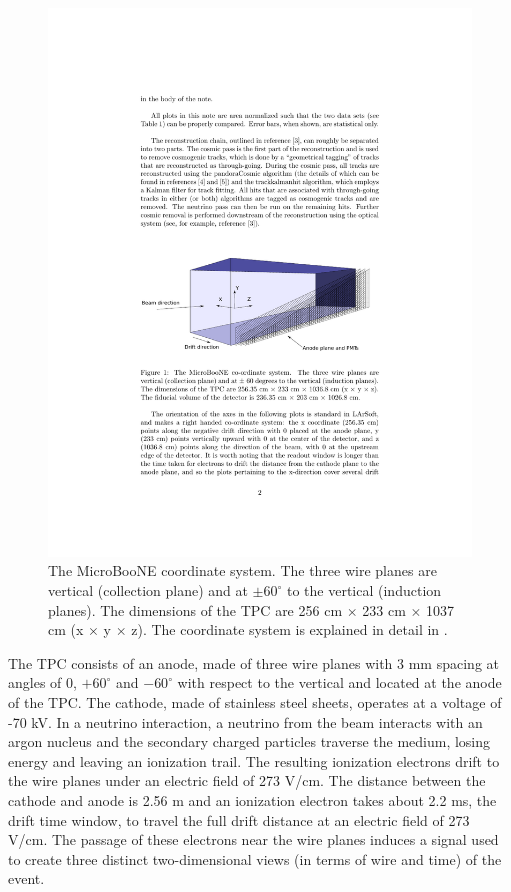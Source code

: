 \documentclass[a4paper,11pt]{article}
\begin{document}
\begin{figure}[htbp]
  \begin{center}
    \includegraphics[width=0.8\linewidth]{figures/coord.pdf}

    \caption{The MicroBooNE coordinate system. The three wire planes are vertical (collection plane) and at  $\pm60^{\circ}$ to the vertical (induction planes). The dimensions of the TPC are 256 cm $\times$ 233 cm $\times$ 1037 cm (x $\times$ y $\times$ z). The coordinate system is explained in detail in \cite{mcdata}.} \label{fig:coord}
  \end{center}
\end{figure}

The TPC consists of an anode, made of three wire planes with 3 mm spacing at angles of 0,  $+60^{\circ}$ and  $-60^{\circ}$ with respect to the vertical and located at the anode of the TPC. The cathode, made of stainless steel sheets, operates at a voltage of -70 kV. In a neutrino interaction, a neutrino from the beam interacts with an argon nucleus and the secondary charged particles traverse the medium, losing energy and leaving an ionization trail. The resulting ionization electrons drift to the wire planes under an electric field of 273 V/cm. The distance between the cathode and anode is 2.56 m and an ionization electron takes about 2.2 ms, the drift time window, to travel the full drift distance at an electric field of 273 V/cm. The passage of these electrons near the wire planes induces a signal used to create three distinct two-dimensional views (in terms of wire and time) of the event.
\end{document}
